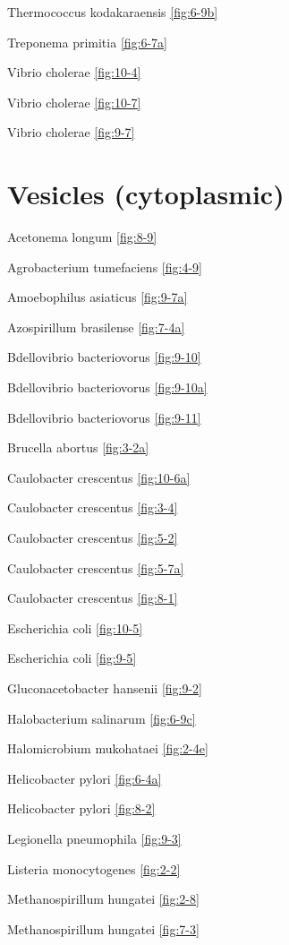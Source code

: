\documentclass[]{tufte-book}
\begin{document}
Thermococcus kodakaraensis \ref{fig:6-9b}

Treponema primitia \ref{fig:6-7a}

Vibrio cholerae \ref{fig:10-4}

Vibrio cholerae \ref{fig:10-7}

Vibrio cholerae \ref{fig:9-7}

\hypertarget{vesicles-cytoplasmic}{%
\section*{Vesicles (cytoplasmic)}\label{vesicles-cytoplasmic}}

Acetonema longum \ref{fig:8-9}

Agrobacterium tumefaciens \ref{fig:4-9}

Amoebophilus asiaticus \ref{fig:9-7a}

Azospirillum brasilense \ref{fig:7-4a}

Bdellovibrio bacteriovorus \ref{fig:9-10}

Bdellovibrio bacteriovorus \ref{fig:9-10a}

Bdellovibrio bacteriovorus \ref{fig:9-11}

Brucella abortus \ref{fig:3-2a}

Caulobacter crescentus \ref{fig:10-6a}

Caulobacter crescentus \ref{fig:3-4}

Caulobacter crescentus \ref{fig:5-2}

Caulobacter crescentus \ref{fig:5-7a}

Caulobacter crescentus \ref{fig:8-1}

Escherichia coli \ref{fig:10-5}

Escherichia coli \ref{fig:9-5}

Gluconacetobacter hansenii \ref{fig:9-2}

Halobacterium salinarum \ref{fig:6-9c}

Halomicrobium mukohataei \ref{fig:2-4e}

Helicobacter pylori \ref{fig:6-4a}

Helicobacter pylori \ref{fig:8-2}

Legionella pneumophila \ref{fig:9-3}

Listeria monocytogenes \ref{fig:2-2}

Methanospirillum hungatei \ref{fig:2-8}

Methanospirillum hungatei \ref{fig:7-3}
\end{document}
